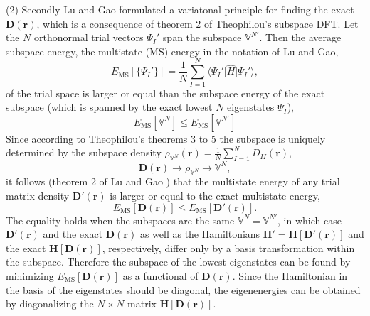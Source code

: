 \documentclass[journal=jacsat,manuscript=article]{achemso}
\newcommand\m[1]{\mathbf{#1}}
\renewcommand\vec[1]{\mathbf{#1}}
\begin{document}
(2) Secondly Lu and Gao formulated a variatonal principle for finding the exact $\m{D}(\vec{r})$, which is a consequence of theorem 2
of Theophilou's subspace DFT. \cite{Theophilou1979}
Let the $N$ orthonormal trial vectors $\Psi_I'$ span the subspace $\mathbb{V}^{N'}$.
Then the average subspace energy, the multistate (MS) energy in the notation of Lu and Gao,
\begin{equation}
  E_{\text{MS}}[\{\Psi_I'\}] = \frac{1}{N} \sum_{I=1}^{N} \langle \Psi_I' \vert \hat{H} \vert \Psi_I' \rangle,
\end{equation}
of the trial space is larger or equal than
the subspace energy of the exact subspace (which is spanned by the exact lowest $N$ eigenstates $\Psi_I$),
\begin{equation}
E_{\text{MS}}[\mathbb{V}^N] \leq E_{\text{MS}}[\mathbb{V}^{N'}]
\end{equation}
Since according to Theophilou's theorems 3 to 5 the subspace is uniquely determined by the subspace density
$\rho_{\mathbb{V}^N}(\vec{r}) = \frac{1}{N} \sum_{I=1}^{N} D_{II}(\vec{r})$,
\begin{equation}
 \m{D}(\vec{r}) \longrightarrow \rho_{\mathbb{V}^N} \longrightarrow \mathbb{V}^N,
\end{equation}
it follows (theorem 2 of Lu and Gao \cite{Lu2022JPCL}) that the multistate energy of any trial matrix density $\m{D}'(\vec{r})$
is larger or equal to the exact multistate energy,
\begin{equation}
 E_{\text{MS}}[\m{D}(\vec{r})] \leq E_{\text{MS}}[\m{D}'(\vec{r})].
\end{equation}
The equality holds when the subspaces are the same $\mathbb{V}^N = \mathbb{V}^{N'}$, in which case $\m{D}'(\vec{r})$ and
the exact $\m{D}(\vec{r})$ as well as the Hamiltonians $\m{H}' = \m{H}[\m{D}'(\vec{r})]$ and the exact $\m{H}[\m{D}(\vec{r})]$, respectively,
 differ only by a basis transformation within the subspace. Therefore the subspace of the lowest eigenstates can be found by minimizing
$E_{\text{MS}}[\m{D}(\vec{r})]$ as a functional of $\m{D}(\vec{r})$.
Since the Hamiltonian in the basis of the eigenstates should be diagonal,
the eigenenergies can be obtained by diagonalizing the $N \times N$ matrix $\m{H}[\m{D}(\vec{r})]$.
\end{document}
